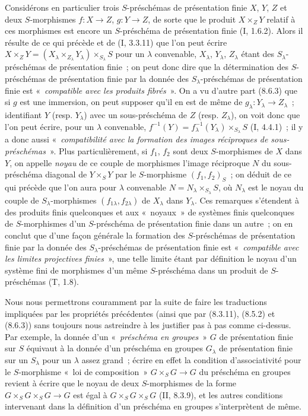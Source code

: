 \begin{env}[8.8.3]
Considérons en particulier trois $S$-préschémas de présentation finie $X$,
$Y$, $Z$ et deux $S$-morphismes $f:X\to Z$, $g:Y\to Z$, de sorte que le
produit $X\times_ZY$ relatif à ces morphismes est encore un $S$-préschéma de
présentation finie (I, 1.6.2). Alors il résulte de ce qui précède et de
(I, 3.3.11) que l'on peut écrire
$X\times_ZY=(X_\lambda\times_{Z_\lambda}Y_\lambda)\times_{S_\lambda}S$ pour
un $\lambda$ convenable, $X_\lambda$, $Y_\lambda$, $Z_\lambda$ étant des
$S_\lambda$-préschémas de présentation finie~; on peut donc dire que la
détermination des $S$-préschémas de présentation finie par la donnée des
$S_\lambda$-préschémas de présentation finie est «~\emph{compatible avec les
produits fibrés}~». On a vu d'autre part (8.6.3) que si $g$ est une immersion,
on peut supposer qu'il en est de même de $g_\lambda:Y_\lambda\to Z_\lambda$~;
identifiant $Y$ (resp. $Y_\lambda$) avec un sous-préschéma de $Z$ (resp.
$Z_\lambda$), on voit donc que l'on peut écrire, pour un $\lambda$ convenable,
$f^{-1}(Y)=f_\lambda^{-1}(Y_\lambda)\times_{S_\lambda}S$ (I, 4.4.1)~; il y a
donc aussi «~\emph{compatibilité avec la formation des images réciproques de
sous-préschémas}~». Plus particulièrement, si $f_1$, $f_2$ sont deux
$S$-morphismes de $X$ dans $Y$, on appelle \emph{noyau} de ce couple de
morphismes l'image réciproque $N$ du sous-préschéma diagonal de $Y\times_SY$
par le $S$-morphisme $(f_1,f_2)_S$~; on déduit de ce qui précède que l'on aura
pour $\lambda$ convenable $N=N_\lambda\times_{S_\lambda}S$, où $N_\lambda$
est le noyau du couple de $S_\lambda$-morphismes
$(f_{1\lambda},f_{2\lambda})$ de $X_\lambda$ dans $Y_\lambda$. Ces remarques
s'étendent à des produits finis quelconques et aux «~noyaux~» de systèmes
finis quelconques de $S$-morphismes d'un $S$-préschéma de présentation finie
dans un autre~; on en conclut que d'une façon générale la formation des
$S$-préschémas de présentation finie par la donnée des
$S_\lambda$-préschémas de présentation finie est «~\emph{compatible avec les
limites projectives finies}~», une telle limite étant par définition le noyau
d'un système fini de morphismes d'un même $S$-préschéma dans un produit de
$S$-préschémas (T, 1.8).

Nous nous permettrons couramment par la suite de faire les traductions
impliquées par les propriétés précédentes (ainsi que par (8.3.11), (8.5.2) et
(8.6.3)) sans toujours nous astreindre à les justifier pas à pas comme
ci-dessus. Par exemple, la donnée d'un «~\emph{préschéma en groupes}~» $G$ de
présentation finie sur $S$ équivaut à la donnée d'un préschéma en groupes
$G_\lambda$ de présentation finie sur un $S_\lambda$ pour un $\lambda$ assez
grand~; écrire en effet la condition d'associativité pour le $S$-morphisme
«~loi de composition~» $G\times_SG\to G$ du préschéma en groupes revient à
écrire que le noyau de deux $S$-morphismes de la forme
$G\times_SG\times_SG\to G$ est égal à $G\times_SG\times_SG$ (II, 8.3.9), et
les autres conditions intervenant dans la définition d'un préschéma en
groupes s'interprètent de même.
\end{env}

